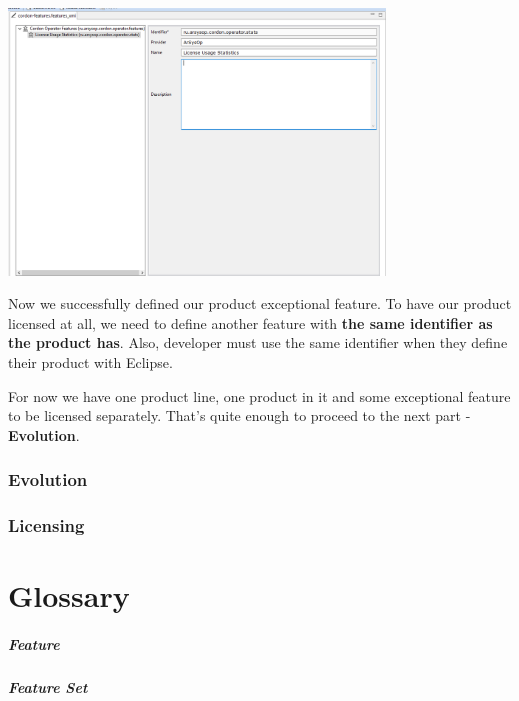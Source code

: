 \documentclass[12pt]{report}
\begin{document}
\begin{center}
    \includegraphics[width=0.75\textwidth]{feature_dialog}
\end{center}

Now we successfully defined our product exceptional feature. To have our product licensed at all, we need to define another feature with \textbf{the same identifier as the product has}. 
Also, developer must use the same identifier when they define their product with Eclipse.

For now we have one product line, one product in it and some exceptional feature to be licensed separately. That's quite enough to proceed to the next part - \textbf{Evolution}.

\subsection*{Evolution}



\subsection*{Licensing}



\chapter*{Glossary}

\paragraph*{Feature}

\paragraph*{Feature Set}
\end{document}
